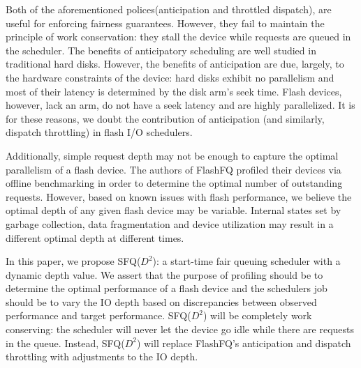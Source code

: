 Both of the aforementioned polices(anticipation and throttled
dispatch), are useful for enforcing fairness guarantees. However, they
fail to maintain the principle of work conservation: they stall the
device while requests are queued in the scheduler. The benefits of
anticipatory scheduling are well studied in traditional hard
disks. However, the benefits of anticipation are due, largely, to the
hardware constraints of the device: hard disks exhibit no parallelism
and most of their latency is determined by the disk arm's seek
time. Flash devices, however, lack an arm, do not have a seek latency
and are highly parallelized. It is for these reasons, we doubt the
contribution of anticipation (and similarly, dispatch throttling) in
flash I/O schedulers.

Additionally, simple request depth may not be enough to capture the
optimal parallelism of a flash device. The authors of FlashFQ profiled
their devices via offline benchmarking in order to determine the
optimal number of outstanding requests. However, based on known issues
with flash performance, we believe the optimal depth of any given
flash device may be variable. Internal states set by garbage
collection, data fragmentation and device utilization may result in a
different optimal depth at different times.

In this paper, we propose SFQ($D^2$): a start-time fair queuing
scheduler with a dynamic depth value. We assert that the purpose of
profiling should be to determine the optimal performance of a flash
device and the schedulers job should be to vary the IO depth based on
discrepancies between observed performance and target
performance. SFQ($D^2$) will be completely work conserving: the
scheduler will never let the device go idle while there are requests
in the queue. Instead, SFQ($D^2$) will replace FlashFQ's anticipation
and dispatch throttling with adjustments to the IO depth.
